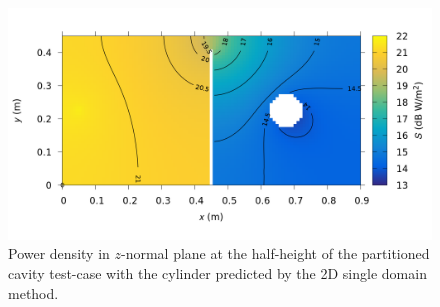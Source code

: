 \documentclass[a4paper]{article}
\numberwithin{equation}{section}
\begin{document}
\begin{figure}[ht]
\begin{center}
\includegraphics[width=0.8\linewidth]{figures/2D_SDM_w_map}
\vspace{-4mm}
\caption{\label{fg:dcsdmpd} Power density in $z$-normal plane at the half-height of the partitioned cavity test-case with the cylinder predicted by the 2D single domain method.}
\end{center}
\end{figure}


%

\end{document}
